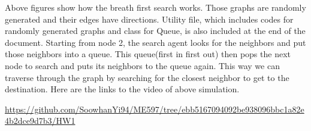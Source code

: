\documentclass{article}
\begin{document}
\begin{problem}
\begin{figure}[!h]
\end{figure}
Above figures show how the breath first search works. Those graphs are randomly generated and their edges have directions. Utility file, which includes codes for randomly generated graphs and class for Queue, is also included at the end of the document. Starting from node 2, the search agent looks for the neighbors and put those neighbors into a queue. This queue(first in first out) then pops the next node to search and puts its neighbors to the queue again. This way we can traverse through the graph by searching for the closest neighbor to get to the destination. Here are the links to the video of above simulation.

\url{https://github.com/SoowhanYi94/ME597/tree/ebb5167094092be938096bbc1a82e4b2dce9d7b3/HW1}

\end{problem}
\end{document}
